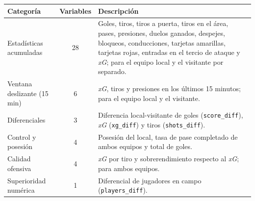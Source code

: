 \begin{table}[H]
    \centering
    \begin{tabular}{lcp{7.5cm}}
        \hline
        \textbf{Categoría}           & \textbf{Variables} & \textbf{Descripción}                                                                                                                                                                                                                                     \\
        \hline
        Estadísticas acumuladas      & 28                 & Goles, tiros, tiros a puerta, tiros en el área, pases, presiones, duelos ganados, despejes, bloqueos, conducciones, tarjetas amarillas, tarjetas rojas, entradas en el tercio de ataque y \textit{xG}; para el equipo local y el visitante por separado. \\[4pt]
        Ventana deslizante (15\,min) & 6                  & \textit{xG}, tiros y presiones en los últimos 15 minutos; para el equipo local y el visitante.                                                                                                                                                           \\[4pt]
        Diferenciales                & 3                  & Diferencia local-visitante de goles (\texttt{score\_diff}), \textit{xG} (\texttt{xg\_diff}) y tiros (\texttt{shots\_diff}).                                                                                                                              \\[4pt]
        Control y posesión           & 4                  & Posesión del local, tasa de pase completado de ambos equipos y total de goles.                                                                                                                                                                           \\[4pt]
        Calidad ofensiva             & 4                  & \textit{xG} por tiro y sobrerendimiento respecto al \textit{xG}; para ambos equipos.                                                                                                                                                                     \\[4pt]
        Superioridad numérica        & 1                  & Diferencial de jugadores en campo (\texttt{players\_diff}).                                                                                                                                                                                              \\[4pt]

\end{tabular}
\end{table}

